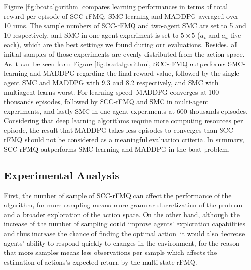 \documentclass[journal,transmag]{IEEEtran}
\begin{document}
Figure \ref{fig:boatalgorithm} compares learning performances in terms of total reward per episode of SCC-rFMQ, SMC-learning and MADDPG averaged over 10 runs. The sample numbers of SCC-rFMQ and two-agent SMC are set to 5 and 10 respectively, and SMC in one agent experiment is set to $5 \times 5$ ($a_v$ and $a_{\omega}$ five each), which are the best settings we found during our evaluations. Besides, all initial samples of those experiments are evenly distributed from the action space. As it can be seen from Figure \ref{fig:boatalgorithm}, SCC-rFMQ outperforms SMC-learning and MADDPG regarding the final reward value, followed by the single agent SMC and MADDPG with $9.3$ and $8.2$ respectively, and SMC with multiagent learns worst. For learning speed, MADDPG converges at 100 thousands episodes, followed by SCC-rFMQ and SMC in multi-agent experiments, and lastly SMC in one-agent experiments at 600 thousands episodes. Considering that deep learning algorithms require more computing resources per episode, the result that  MADDPG takes less episodes to converges than SCC-rFMQ should not be considered as a meaningful evaluation criteria. In summary, SCC-rFMQ outperforms SMC-learning and MADDPG in the boat problem.

\subsection{Experimental Analysis}

First, the number of sample of SCC-rFMQ can affect the performance of the algorithm, for more sampling means more granular discretization of the problem and a broader exploration of the action space. On the other hand, although the increase of the number of sampling could improve agents' exploration capabilities and thus increase the chance of finding the optimal action, it would also decrease agents' ability to respond quickly to changes in the environment, for the reason that more samples means less observations per sample which affects the estimation of actions's expected return by the multi-state rFMQ.%
\end{document}
